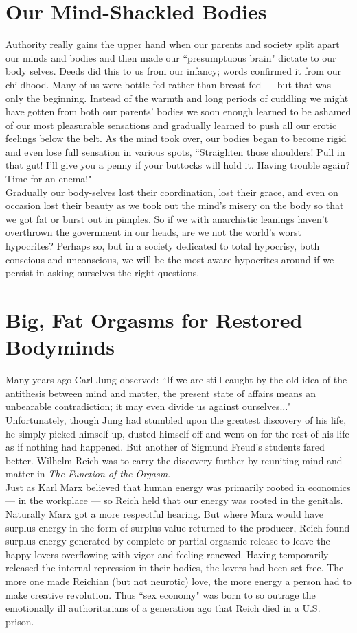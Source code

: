 \section*{Our Mind-Shackled Bodies}
Authority really gains the upper hand when our parents and society split apart our minds and bodies and then made our ``presumptuous brain" dictate to our body selves. Deeds did this to us from our infancy; words confirmed it from our childhood. Many of us were bottle-fed rather than breast-fed --- but that was only the beginning. Instead of the warmth and long periods of cuddling we might have gotten from both our parents' bodies we soon enough learned to be ashamed of our most pleasurable sensations and gradually learned to push all our erotic feelings below the belt. As the mind took over, our bodies began to become rigid and even lose full sensation in various spots, ``Straighten those shoulders! Pull in that gut! I'll give you a penny if your buttocks will hold it. Having trouble again? Time for an enema!"\\
Gradually our body-selves lost their coordination, lost their grace, and even on occasion lost their beauty as we took out the mind's misery on the body so that we got fat or burst out in pimples. So if we with anarchistic leanings haven't overthrown the government in our heads, are we not the world's worst hypocrites? Perhaps so, but in a society dedicated to total hypocrisy, both conscious and unconscious, we will be the most aware hypocrites around if we persist in asking ourselves the right questions.

\section*{Big, Fat Orgasms for Restored Bodyminds}
Many years ago Carl Jung observed: ``If we are still caught by the old idea of the antithesis between mind and matter, the present state of affairs means an unbearable contradiction; it may even divide us against ourselves..." Unfortunately, though Jung had stumbled upon the greatest discovery of his life, he simply picked himself up, dusted himself off and went on for the rest of his life as if nothing had happened. But another of Sigmund Freud's students fared better. Wilhelm Reich was to carry the discovery further by reuniting mind and matter in \emph{The Function of the Orgasm}.\\
Just as Karl Marx believed that human energy was primarily rooted in economics --- in the workplace --- so Reich held that our energy was rooted in the genitals. Naturally Marx got a more respectful hearing. But where Marx would have surplus energy in the form of surplus value returned to the producer, Reich found surplus energy generated by complete or partial orgasmic release to leave the happy lovers overflowing with vigor and feeling renewed. Having temporarily released the internal repression in their bodies, the lovers had been set free. The more one made Reichian (but not neurotic) love, the more energy a person had to make creative revolution. Thus ``sex economy" was born to so outrage the emotionally ill authoritarians of a generation ago that Reich died in a U.S. prison.

